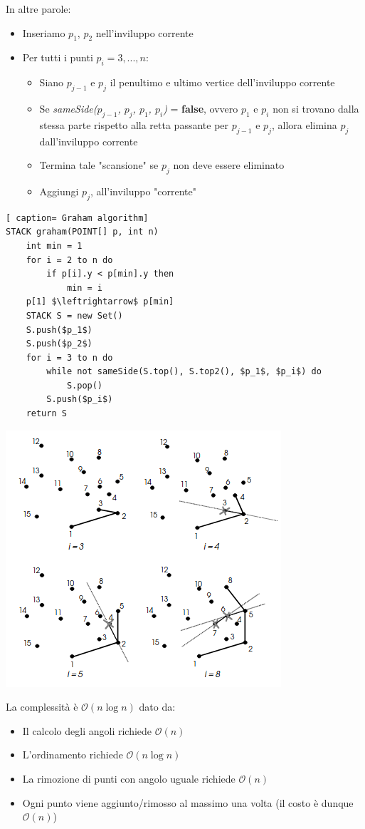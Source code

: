 \documentclass[../cheatSheetAlgoritmi.tex]{subfiles}
\begin{document}
In altre parole:
\begin{itemize}
	\item Inseriamo $p_1$, $p_2$ nell'inviluppo corrente
	\item Per tutti i punti $p_i = 3, . . . , n$:
	\begin{itemize}
		\item Siano $p_{j - 1}$ e $p_j$ il penultimo e ultimo vertice dell'inviluppo corrente
		\item Se \emph{sameSide($p_{j - 1}$, $p_j$, $p_1$, $p_i$)} = \textbf{false}, ovvero $p_1$ e $p_i$ non si trovano dalla stessa parte rispetto alla retta passante per $p_{j - 1}$ e $p_j$, allora elimina $p_j$ dall'inviluppo corrente
		\item Termina tale "scansione" se $p_j$ non deve essere eliminato
		\item Aggiungi $p_j$, all'inviluppo "corrente"
	\end{itemize}
\end{itemize}
 \begin{lstlisting}[ caption= Graham algorithm]
STACK graham(POINT[] p, int n)
	int min = 1
	for i = 2 to n do
		if p[i].y < p[min].y then 
			min = i
	p[1] $\leftrightarrow$ p[min]
	STACK S = new Set()
	S.push($p_1$)
	S.push($p_2$)
	for i = 3 to n do
		while not sameSide(S.top(), S.top2(), $p_1$, $p_i$) do
			S.pop()
		S.push($p_i$)
	return S
\end{lstlisting}
\begin{center}
	\includegraphics{../img/backtracking_inviluppo_convesso_graham_2}
\end{center}
La complessità è $\mathcal{O}(n \log n)$ dato da:
\begin{itemize}
	\item Il calcolo degli angoli richiede $\mathcal{O}(n)$
	\item L'ordinamento richiede $\mathcal{O}(n \log n)$
	\item La rimozione di punti con angolo uguale richiede $\mathcal{O}(n)$
	\item Ogni punto viene aggiunto/rimosso al massimo una volta (il costo è dunque $\mathcal{O}(n)$)
\end{itemize}
 
\end{document}

